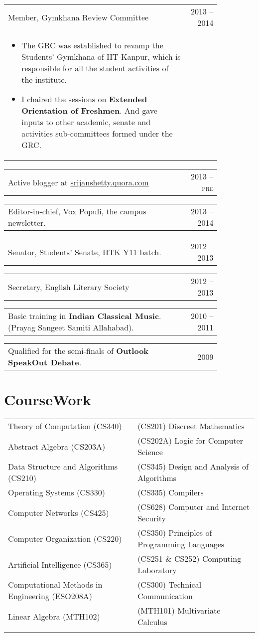 \documentclass[a4paper,10pt]{article} %
\newcommand{\projectlistdated}[3]{
    \begin{tabular}{p{0.85\linewidth}r}
        \textcolor{NavyBlue}{#2} & \multicolumn{1}{m{3cm}}{\raggedleft \textsc{#1}}\\
        \vspace{-0.3cm}
        \footnotesize{#3}
    \end{tabular}
    \vspace{-0.4cm}
}
\newcommand{\skill}[2]{
    \begin{tabular}{p{0.85\linewidth}r}
        #2 & \multicolumn{1}{m{3cm}}{\raggedleft \textsc{#1}}\\
    \end{tabular}
    \vspace{-0.5cm}
}
\begin{document}
\projectlistdated {2013 -- 2014}
                  {Member, Gymkhana Review Committee}
                  {
                       \begin{itemize}[leftmargin=0.5cm]
                           \item The GRC was established to revamp the Students' Gymkhana of IIT Kanpur,
                               which is responsible for all the student activities of the institute.
                           \item I chaired the sessions on \textbf{Extended Orientation of Freshmen}.
                               And gave inputs to other academic, senate and activities sub-committees formed under the GRC.
                       \end{itemize}
                  }

\skill {2013 -- pre}
       {Active blogger at \href{srijanshetty.quora.com} {srijanshetty.quora.com}}

\skill {2013 -- 2014}
       {Editor-in-chief, Vox Populi, the campus newsletter.}

\skill {2012 -- 2013}
       {Senator, Students' Senate, IITK Y11 batch.}

\skill {2012 -- 2013}
       {Secretary, English Literary Society}

\skill {2010 -- 2011}
       {Basic training in \textbf{Indian Classical Music}. (Prayag Sangeet Samiti Allahabad).}

\skill {2009}
       {Qualified for the semi-finals of \textbf{Outlook SpeakOut Debate}.}


\section{CourseWork}

\begin{tabular}{>{\raggedleft}p{8cm}|p{8cm}}

    Theory of Computation (CS340) & (CS201) Discreet Mathematics \\
    Abstract Algebra (CS203A) & (CS202A) Logic for Computer Science \\
    Data Structure and Algorithms (CS210) & (CS345) Design and Analysis of Algorithms \\
    Operating Systems (CS330) & (CS335) Compilers \\
    Computer Networks (CS425) &  (CS628) Computer and Internet Security \\
    Computer Organization (CS220) & (CS350) Principles of Programming Languages \\
    Artificial Intelligence (CS365) & (CS251 \& CS252) Computing Laboratory \\
    Computational Methods in Engineering (ESO208A) & (CS300) Technical Communication \\
    Linear Algebra (MTH102) &  (MTH101) Multivariate Calculus \\
                     \\
\end{tabular}
\end{document}
